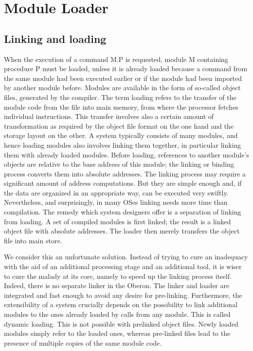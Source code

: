 \chapter{Module Loader}
\label{ch:ML}
\section{Linking and loading}
When the execution of a command M.P is requested, module M containing procedure P must be
loaded, unless it is already loaded because a command from the same module had been executed
earlier or if the module had been imported by another module before. Modules are available in the
form of so-called object files, generated by the compiler. The term loading refers to the transfer of the
module code from the file into main memory, from where the processor fetches individual instructions.
This transfer involves also a certain amount of transformation as required by the object file format on
the one hand and the storage layout on the other. A system typically consists of many modules, and
hence loading modules also involves linking them together, in particular linking them with already
loaded modules. Before loading, references to another module's objects are relative to the base
address of this module; the linking or binding process converts them into absolute addresses.
The linking process may require a significant amount of address computations. But they are simple
enough and, if the data are organized in an appropriate way, can be executed very swiftly.
Nevertheless, and surprisingly, in many OSes linking needs more time than compilation.
The remedy which system designers offer is a separation of linking from loading. A set of compiled
modules is first linked; the result is a linked object file with absolute addresses. The loader then
merely transfers the object file into main store.

We consider this an unfortunate solution. Instead of trying to cure an inadequacy with the aid of an
additional processing stage and an additional tool, it is wiser to cure the malady at its core, namely to
speed up the linking process itself. Indeed, there is no separate linker in the Oberon. The
linker and loader are integrated and fast enough to avoid any desire for pre-linking. Furthermore, the
extensibility of a system crucially depends on the possibility to link additional modules to the ones
already loaded by calls from any module. This is called dynamic loading. This is not possible with prelinked object files. Newly loaded modules simply refer to the loaded ones, whereas pre-linked files lead to the presence of multiple copies of the same module code.

